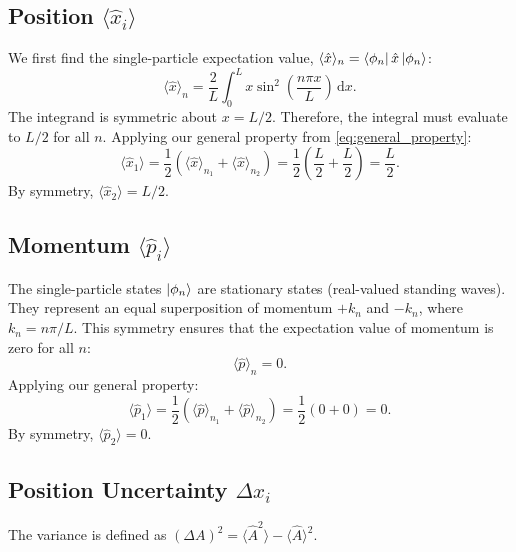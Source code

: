 \subsection{Position $\langle \hat{x}_i \rangle$}
We first find the single-particle expectation value,
$\langle \hat{x} \rangle_n = \bra{{\phi}_n} \hat{x}
\ket{{\phi}_n}$:
\begin{equation}
  \langle \hat{x} \rangle_n = \frac{2}{L}
  \int_0^L x \sin^2\left(\frac{n\pi x}{L}\right) \,\mathrm{d}x.
\end{equation}
The integrand is symmetric about $x = L/2$. Therefore, the
integral must evaluate to $L/2$ for all $n$.
Applying our general property from \cref{eq:general_property}:
\begin{equation}
  \langle \hat{x}_1 \rangle = \frac{1}{2}
  \left( \langle \hat{x} \rangle_{n_1} +
  \langle \hat{x} \rangle_{n_2} \right) =
  \frac{1}{2} \left( \frac{L}{2} + \frac{L}{2} \right) = \frac{L}{2}.
\end{equation}
By symmetry, $\langle \hat{x}_2 \rangle = L/2$.

\subsection{Momentum $\langle \hat{p}_i \rangle$}
The single-particle states $\ket{{\phi}_n}$ are stationary
states (real-valued standing waves). They represent an equal
superposition of momentum $+k_n$ and $-k_n$, where
$k_n = n\pi/L$. This symmetry ensures that the expectation
value of momentum is zero for all $n$:
\begin{equation}
  \langle \hat{p} \rangle_n = 0.
\end{equation}
Applying our general property:
\begin{equation}
  \langle \hat{p}_1 \rangle = \frac{1}{2}
  \left( \langle \hat{p} \rangle_{n_1} +
  \langle \hat{p} \rangle_{n_2} \right) =
  \frac{1}{2} (0 + 0) = 0.
\end{equation}
By symmetry, $\langle \hat{p}_2 \rangle = 0$.

\subsection{Position Uncertainty $\Delta x_i$}
The variance is defined as $(\Delta A)^2 = \langle \hat{A}^2 \rangle
- \langle \hat{A} \rangle^2$.

